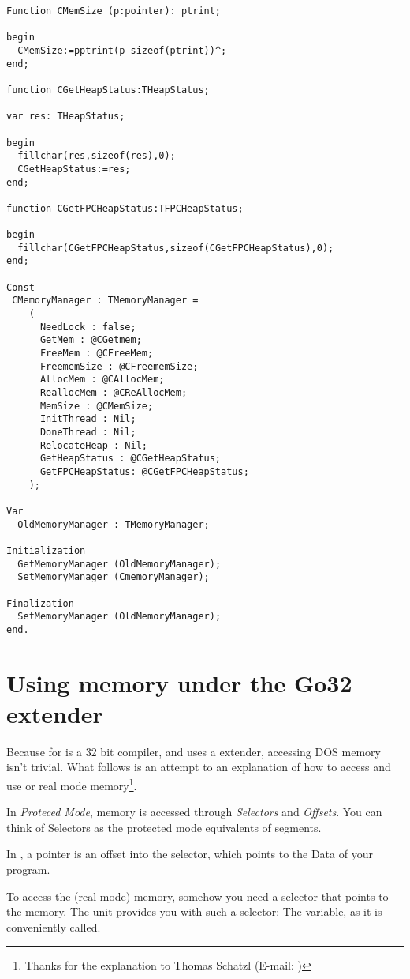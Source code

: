 \begin{verbatim}
Function CMemSize (p:pointer): ptrint;

begin
  CMemSize:=pptrint(p-sizeof(ptrint))^;
end;

function CGetHeapStatus:THeapStatus;

var res: THeapStatus;

begin
  fillchar(res,sizeof(res),0);
  CGetHeapStatus:=res;
end;

function CGetFPCHeapStatus:TFPCHeapStatus;

begin
  fillchar(CGetFPCHeapStatus,sizeof(CGetFPCHeapStatus),0);
end;

Const
 CMemoryManager : TMemoryManager =
    (
      NeedLock : false;
      GetMem : @CGetmem;
      FreeMem : @CFreeMem;
      FreememSize : @CFreememSize;
      AllocMem : @CAllocMem;
      ReallocMem : @CReAllocMem;
      MemSize : @CMemSize;
      InitThread : Nil;
      DoneThread : Nil;
      RelocateHeap : Nil;
      GetHeapStatus : @CGetHeapStatus;
      GetFPCHeapStatus: @CGetFPCHeapStatus;	
    );

Var
  OldMemoryManager : TMemoryManager;

Initialization
  GetMemoryManager (OldMemoryManager);
  SetMemoryManager (CmemoryManager);

Finalization
  SetMemoryManager (OldMemoryManager);
end.
\end{verbatim}

\section{Using \dos memory under the Go32 extender}
\label{se:AccessingDosMemory}

Because \fpc for \dos is a 32 bit compiler, and uses a \dos extender, accessing DOS
memory isn't trivial. What follows is an attempt to an explanation of how to
access and use \dos or real mode memory\footnote{Thanks for the explanation to
Thomas Schatzl (E-mail: )}.

In {\em Proteced Mode}, memory is accessed through {\em Selectors} and
{\em Offsets}. You can think of Selectors as the protected mode
equivalents of segments.

In \fpc, a pointer is an offset into the  selector, which points to
the Data of your program.

To access the (real mode) \dos memory, somehow you need a selector that
points to the \dos memory.
The  unit provides you with such a selector: The
 variable, as it is conveniently called.

